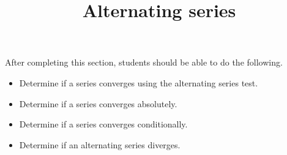 \documentclass{ximera}
\title{Alternating series}
\begin{document}
\begin{abstract}
\end{abstract}

\maketitle

\begin{sectionOutcomes}

After completing this section, students should be able to do the following.

\begin{itemize}
\item Determine if a series converges using the alternating series test.
\item Determine if a series converges absolutely.
\item Determine if a series converges conditionally.
\item Determine if an alternating series diverges.
\end{itemize}

\end{sectionOutcomes}
\end{document}
